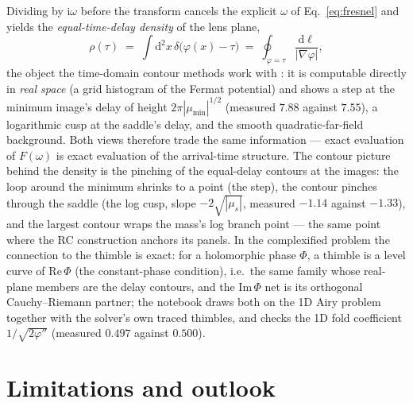 \documentclass[11pt,a4paper]{article}
\newcommand{\ii}{\mathrm{i}}
\newcommand{\dd}{\mathrm{d}}
\begin{document}
Dividing by $\ii\omega$ before the transform cancels the explicit $\omega$ of
Eq.~\eqref{eq:fresnel} and yields the \emph{equal-time-delay density} of the lens plane,
\begin{equation}
  \rho(\tau) \;=\; \int \dd^2x\,\delta\bigl(\varphi(x)-\tau\bigr)
  \;=\; \oint_{\varphi=\tau}\frac{\dd\ell}{|\nabla\varphi|},
  \label{eq:delaydensity}
\end{equation}
the object the time-domain contour methods work with \cite{Ephremidze2026}: it is computable
directly in \emph{real space} (a grid histogram of the Fermat potential) and shows a step at
the minimum image's delay of height $2\pi|\mu_{\min}|^{1/2}$ (measured $7.88$ against $7.55$),
a logarithmic cusp at the saddle's delay, and the smooth quadratic-far-field background.  Both
views therefore trade the same information --- exact evaluation of $F(\omega)$ is exact
evaluation of the arrival-time structure.  The contour picture behind the density is the
pinching of the equal-delay contours at the images: the loop around the minimum shrinks to a
point (the step), the contour pinches through the saddle (the log cusp, slope
$-2\sqrt{|\mu_s|}$, measured $-1.14$ against $-1.33$), and the largest contour wraps the
mass's log branch point --- the same point where the RC construction anchors its panels.  In
the complexified problem the connection to the thimble is exact: for a holomorphic phase
$\Phi$, a thimble is a level curve of $\mathrm{Re}\,\Phi$ (the constant-phase condition),
i.e.\ the same family whose real-plane members are the delay contours, and the
$\mathrm{Im}\,\Phi$ net is its orthogonal Cauchy--Riemann partner; the notebook draws both on
the 1D Airy problem together with the solver's own traced thimbles, and checks the 1D fold
coefficient $1/\sqrt{2\varphi''}$ (measured $0.497$ against $0.500$).

\section{Limitations and outlook}
\label{sec:outlook}
\end{document}

